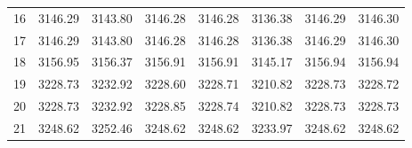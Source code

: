 \documentclass[10pt,oneside]{article}
\begin{document}
\begin{table}[h!]
\begin{tabular}{cccccccc}
16 &   3146.29 & 3143.80 & 3146.28 & 3146.28 &      3136.38 & 3146.29 & 3146.30 \\
17 &   3146.29 & 3143.80 & 3146.28 & 3146.28 &      3136.38 & 3146.29 & 3146.30 \\
18 &   3156.95 & 3156.37 & 3156.91 & 3156.91 &      3145.17 & 3156.94 & 3156.94 \\
19 &   3228.73 & 3232.92 & 3228.60 & 3228.71 &      3210.82 & 3228.73 & 3228.72 \\
20 &   3228.73 & 3232.92 & 3228.85 & 3228.74 &      3210.82 & 3228.73 & 3228.73 \\
21 &   3248.62 & 3252.46 & 3248.62 & 3248.62 &      3233.97 & 3248.62 & 3248.62 \\
\bottomrule
\end{tabular}
\end{table}

\clearpage
\end{document}
